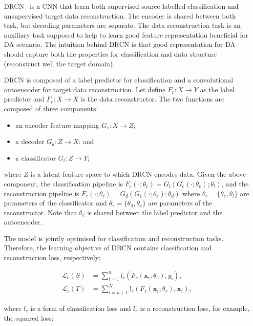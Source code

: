 DRCN~\cite{ghifary2016} is a CNN that learn both supervised source labelled classification and unsupervised target data reconstruction.
The encoder is shared between both task, but decoding parameters are separate.
The data reconstruction task is an auxiliary task supposed to help to learn good feature representation beneficial for DA scenario.
The intuition behind DRCN is
that good representation for DA should capture both the properties for classification and data structure
(reconstruct well the target domain).

DRCN is composed of a label predictor for classification
and a convolutional autoencoder for target data reconstruction.
Let define \(F_c: X \to Y\) as the label predictor
and \(F_r: X \to X\) is the data reconstructor.
The two functions are composed of three components:

\begin{itemize}
	\item an encoder feature mapping \(G_e: X \to Z\);
	\item a decoder \(G_d: Z \to X\); and
	\item a classificator \(G_l: Z \to Y\);
\end{itemize}

where \(Z\) is a latent feature space to which DRCN encodes data.
Given the above component,
the classification pipeline is \(F_c(\cdot; \theta_c) = G_l(G_e(\cdot; \theta_e); \theta_l)\),
and the reconstruction pipeline is \(F_r(\cdot; \theta_r) = G_d(G_e(\cdot; \theta_e); \theta_d)\)
where \(\theta_c = \{\theta_e, \theta_l\}\) are parameters of the classificator
and \(\theta_r = \{\theta_d, \theta_e\}\) are parameters of the reconstructor.
Note that \(\theta_e\) is shared between the label predictor and the autoencoder.

The model is jointly optimised for classification and reconstruction tasks.
Therefore, the learning objective of DRCN contains classification and reconstruction loss, respectively:

\begin{align}
	\mathcal{L}_c(S) &= \sum_{i = 1}^{n}
	l_c(F_c(\mathbf{x}_i; \theta_c), y_i),
	\label{drcn_classification_loss} \\
	\mathcal{L}_r(T) &= \sum_{i = n + 1}^{N}
	l_r(F_r(\mathbf{x}_i; \theta_r), \mathbf{x}_i),
	\label{drcn_reconstruction_loss}
\end{align}

where \(l_c\) is a form of classification loss
and \(l_r\) is a reconstruction loss, for example, the squared loss:

